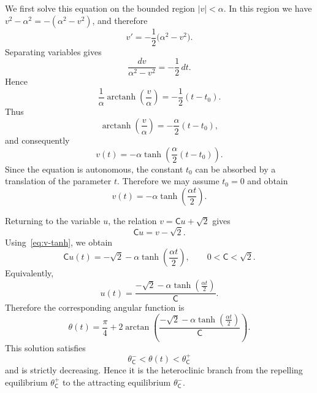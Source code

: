\documentclass[11pt,a4paper]{amsart}
\theoremstyle{plain}
\theoremstyle{remark}
\newcommand{\C}{\mathsf{C}}
\begin{document}
We first solve this equation on the bounded region $|v|<\alpha$. In this
region we have $v^{2}-\alpha^{2}=-(\alpha^{2}-v^{2})$, and therefore
\[
v'=-\frac{1}{2}\bigl(\alpha^{2}-v^{2}\bigr).
\]
Separating variables gives
\begin{equation}\label{eq:sub-sep-tanh}
\frac{dv}{\alpha^{2}-v^{2}}
=
-\frac{1}{2}\,dt.
\end{equation}
Hence
\begin{equation}\label{eq:sub-int-tanh}
\frac{1}{\alpha}
\operatorname{arctanh}\left(\frac{v}{\alpha}\right)
=
-\frac{1}{2}(t-t_{0}).
\end{equation}
Thus
\[
\operatorname{arctanh}\left(\frac{v}{\alpha}\right)
=
-\frac{\alpha}{2}(t-t_{0}),
\]
and consequently
\[
v(t)
=
-\alpha
\tanh\left(\frac{\alpha}{2}(t-t_{0})\right).
\]
Since the equation is autonomous, the constant $t_{0}$ can be absorbed by a
translation of the parameter $t$. Therefore we may assume $t_{0}=0$ and obtain
\begin{equation}\label{eq:v-tanh}
v(t)
=
-\alpha
\tanh\left(\frac{\alpha t}{2}\right).
\end{equation}

Returning to the variable $u$, the relation $v=\C u+\sqrt{2}$ gives
\[
\C u=v-\sqrt{2}.
\]
Using~\eqref{eq:v-tanh}, we obtain
\begin{equation}\label{eq:sub-u-tanh}
\boxed{\;
\C u(t)
=
-\sqrt{2}
-
\alpha
\tanh\left(\frac{\alpha t}{2}\right),
\qquad
0<\C<\sqrt{2}.
\;}
\end{equation}
Equivalently,
\begin{equation}\label{eq:u-tanh-explicit}
u(t)
=
\frac{
-\sqrt{2}
-
\alpha
\tanh\left(\frac{\alpha t}{2}\right)
}{\C}.
\end{equation}
Therefore the corresponding angular function is
\begin{equation}\label{eq:sub-theta-tanh}
\theta(t)
=
\frac{\pi}{4}
+
2\arctan\left(
\frac{
-\sqrt{2}
-
\alpha
\tanh\left(\frac{\alpha t}{2}\right)
}{\C}
\right).
\end{equation}
This solution satisfies
\[
\theta_{\C}^{-}<\theta(t)<\theta_{\C}^{+}
\]
and is strictly decreasing. Hence it is the heteroclinic branch from the
repelling equilibrium $\theta_{\C}^{+}$ to the attracting equilibrium
$\theta_{\C}^{-}$.
\end{document}
